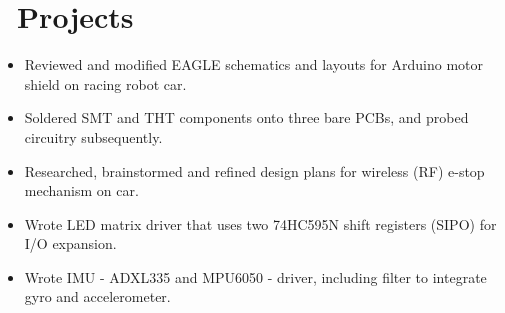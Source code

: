 \documentclass{resume}
\begin{document}
\section{\faFlask\ Projects}

\begin{itemize}
  \item Reviewed and modified EAGLE schematics and layouts for Arduino motor shield on racing robot car.
  \item Soldered SMT and THT components onto three bare PCBs, and probed circuitry subsequently.
  \item Researched, brainstormed and refined design plans for wireless (RF) e-stop mechanism on car.
\end{itemize}

\begin{itemize}
  \item Wrote LED matrix driver that uses two 74HC595N shift registers (SIPO) for I/O expansion.
  \item Wrote IMU - ADXL335 and MPU6050 - driver, including filter to integrate gyro and accelerometer.
\end{itemize}

\begin{comment}
\datedsubsection{\textbf{Hackathons}}{Various}
\begin{itemize}
  \item \href{https://github.com/DChang87/HtN}{Pebble-run dosage notification service - \textit{SmartMeds}; used C.} \hfill Hack the North, 2015
  \item \href{jkkd.com}{IMU-based instructor - \textit{Yoga Yoda}; developed business case. \hfill} PCH Hardware Hackathon, 2015
  \item \href{http://devpost.com/software/drumyo}{Myo-controlled air drum kit - \textit{DruMyo}; used C++. \hfill} hackWaterloo, 2014
  \item \href{https://github.com/fanwashere/SolidWorksControls}{Myo-enabled Solidworks controller; used Lua. \hfill} Hack the North, 2014
\end{itemize}
\end{comment}
\end{document}
